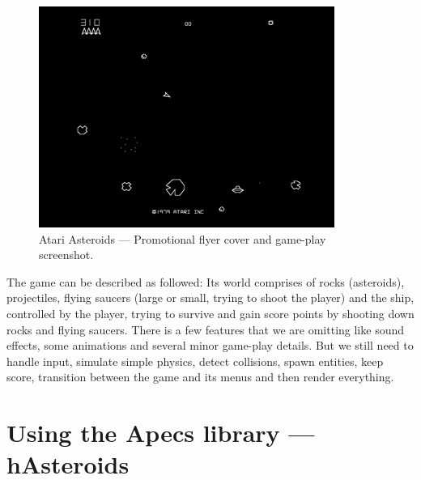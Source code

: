 \documentclass[
  digital, %
  color,   %
  table,   %
  oneside, %
  lof,     %
  lot,     %
]{fithesis3}
\begin{document}
\begin{figure}
    \hfill
    \begin{minipage}{0.66\textwidth}
        \hfill \includegraphics[height=0.65\textwidth]{images/atariasteroids-screenshot.png}
    \end{minipage}
    \caption{Atari Asteroids --- Promotional flyer cover\cite{asteroidsflyer}
    and game-play screenshot.\cite{asteroidsscreenshot}}
\end{figure}

The game can be described as followed:
\cite{aboutasteroids}
Its world comprises of rocks (asteroids), projectiles,
flying saucers (large or small, trying to shoot the player) and the ship, controlled by the player,
trying to survive and gain score points by shooting down rocks and flying saucers.
There is a few features that we are omitting like sound effects, some animations
and several minor game-play details. But we still need to handle input, simulate simple physics,
detect collisions, spawn entities, keep score, transition between the game
and its menus and then render everything.



\chapter{Using the Apecs library --- hAsteroids}
\label{chptr:hasteroids}
\end{document}
